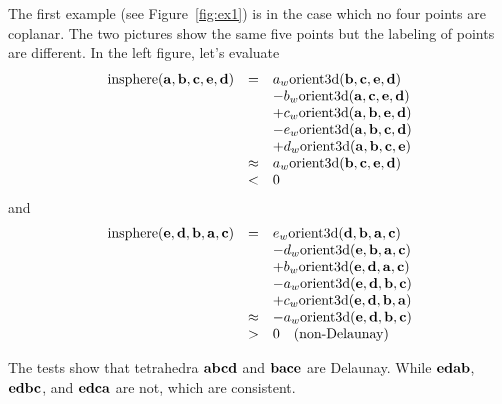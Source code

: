 The first example (see Figure~\ref{fig:ex1}) is in the case which no four points are coplanar. The two pictures show the same five points but the labeling of points are different.  In the left figure, let's evaluate
\[
\begin{array}{rcl}
\textrm{insphere}({\bf a}, {\bf b}, {\bf c}, {\bf e}, {\bf d}) &=&
a_w\textrm{orient3d}({\bf b}, {\bf c}, {\bf e}, {\bf d})\\
& & -b_w\textrm{orient3d}({\bf a}, {\bf c}, {\bf e}, {\bf d})\\
& & +c_w\textrm{orient3d}({\bf a}, {\bf b}, {\bf e}, {\bf d})\\
& & -e_w\textrm{orient3d}({\bf a}, {\bf b}, {\bf c}, {\bf d})\\
& & +d_w\textrm{orient3d}({\bf a}, {\bf b}, {\bf c}, {\bf e})\\
&\approx& a_w\textrm{orient3d}({\bf b}, {\bf c}, {\bf e}, {\bf d})\\
&<& 0
\end{array}
\]
and
\[
\begin{array}{rcl}
\textrm{insphere}({\bf e}, {\bf d}, {\bf b}, {\bf a}, {\bf c}) &=&
e_w\textrm{orient3d}({\bf d}, {\bf b}, {\bf a}, {\bf c})\\
& & -d_w\textrm{orient3d}({\bf e}, {\bf b}, {\bf a}, {\bf c})\\
& & +b_w\textrm{orient3d}({\bf e}, {\bf d}, {\bf a}, {\bf c})\\
& & -a_w\textrm{orient3d}({\bf e}, {\bf d}, {\bf b}, {\bf c})\\
& & +c_w\textrm{orient3d}({\bf e}, {\bf d}, {\bf b}, {\bf a})\\
&\approx& -a_w\textrm{orient3d}({\bf e}, {\bf d}, {\bf b}, {\bf c})\\
&>& 0  \quad \textrm{(non-Delaunay)}
\end{array}
\]

The tests show that tetrahedra ${\bf abcd}$ and ${\bf bace}$ are Delaunay.  While ${\bf edab}$, ${\bf edbc}$, and ${\bf edca}$ are not, which are consistent.

